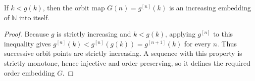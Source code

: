 \begin{lemma}
If $k<g(k)$, then the orbit map
$G(n)=g^{[n]}(k)$ is an increasing embedding of $\mathbb N$ into itself.
\end{lemma}
\begin{proof}
Because $g$ is strictly increasing and $k<g(k)$, applying $g^{[n]}$ to this
inequality gives
$g^{[n]}(k)<g^{[n]}(g(k))=g^{[n+1]}(k)$ for every $n$.  Thus successive
orbit points are strictly increasing.  A sequence with this property is
strictly monotone, hence injective and order preserving, so it defines the
required order embedding $G$.
\end{proof}
